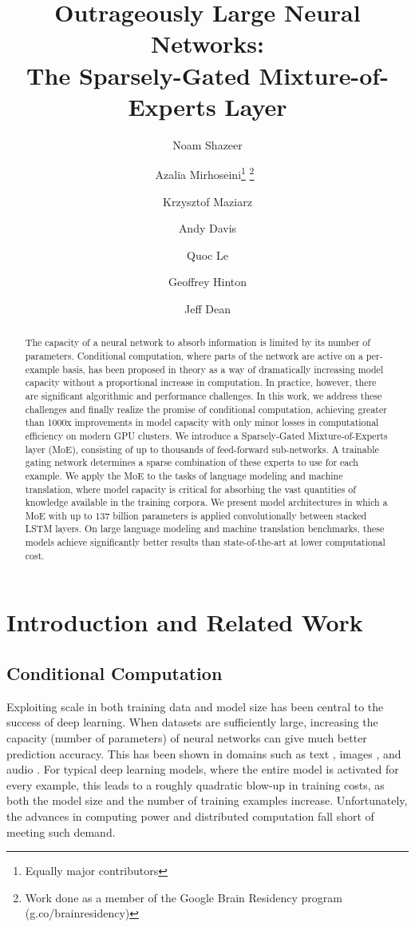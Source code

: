\documentclass{article} \pdfoutput=1
\title{\Large Outrageously Large Neural Networks: \\
The Sparsely-Gated Mixture-of-Experts Layer}
\author[1]{Noam Shazeer}
\author[1]{Azalia Mirhoseini\thanks{Equally major contributors} \thanks{Work done as a member of the Google Brain Residency program (g.co/brainresidency)}~}
\author[2]{Krzysztof Maziarz}
\author[1]{Andy Davis}
\author[1]{Quoc Le}
\author[1]{Geoffrey Hinton}
\author[1]{Jeff Dean}
\affil[1]{Google Brain, \{noam,azalia,andydavis,qvl,geoffhinton,jeff\}@google.com}
\affil[2]{Jagiellonian University, Cracow, krzysztof.maziarz@student.uj.edu.pl}
\begin{document}
\maketitle

\begin{abstract}


The capacity of a neural network to absorb information is limited by its number of parameters.  Conditional computation, where parts of the network are active on a per-example basis, has been proposed in theory as a way of dramatically increasing model capacity without a proportional increase in computation.  In practice, however, there are significant algorithmic and performance challenges.  In this work, we address these challenges and finally realize the promise of conditional computation, achieving greater than 1000x improvements in model capacity with only minor losses in computational efficiency on modern GPU clusters.  We introduce a Sparsely-Gated Mixture-of-Experts layer (MoE), consisting of up to thousands of feed-forward sub-networks.  A trainable gating network determines a sparse combination of these experts to use for each example.  We apply the MoE to the tasks of language modeling and machine translation, where model capacity is critical for absorbing the vast quantities of knowledge available in the training corpora.  We present model architectures in which a MoE with up to 137 billion parameters is applied convolutionally between stacked LSTM layers.  On large language modeling and machine translation benchmarks, these models achieve significantly better results than state-of-the-art at lower computational cost.



\end{abstract}


\section{Introduction and Related Work}
\subsection{Conditional Computation}




Exploiting scale in both training data and model size has been central to the success of deep learning. When datasets are sufficiently large, increasing the capacity (number of parameters) of neural networks can give much better prediction accuracy.  This has been shown in domains such as text \citep{sutskever2014sequence,bahdanau2014neural,RafalNoam16,GNMT}, images \citep{Imagenet,qvl2012building}, and audio \citep{hinton2012deep,DeepSpeech2}.   For typical deep learning models, where the entire model is activated for every example, this leads to a roughly quadratic blow-up in training costs, as both the model size and the number of training examples increase.  Unfortunately, the advances in computing power and distributed computation fall short of meeting such demand. 
\end{document}
